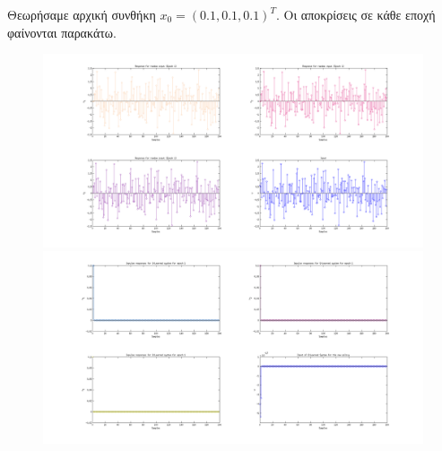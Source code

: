 \documentclass[a4paper,oneside,12pt]{article}
\begin{document}
Θεωρήσαμε αρχική συνθήκη $x_0 = (0.1, 0.1, 0.1)^T$. Οι αποκρίσεις σε κάθε εποχή φαίνονται παρακάτω.


\begin{figure}[H]
\centering
\includegraphics[scale=0.35]{s_1.png} \\
\includegraphics[scale=0.35]{q_1.png} \\
\label{}
\end{figure}
\end{document}
